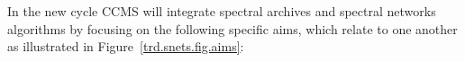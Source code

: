 \documentclass[arial,11pt]{article}
\begin{document}
%
%

In the new cycle CCMS will integrate spectral archives and spectral networks algorithms by focusing on the following specific aims, which relate to one another as illustrated in Figure~\ref{trd.snets.fig.aims}:

\end{document}
